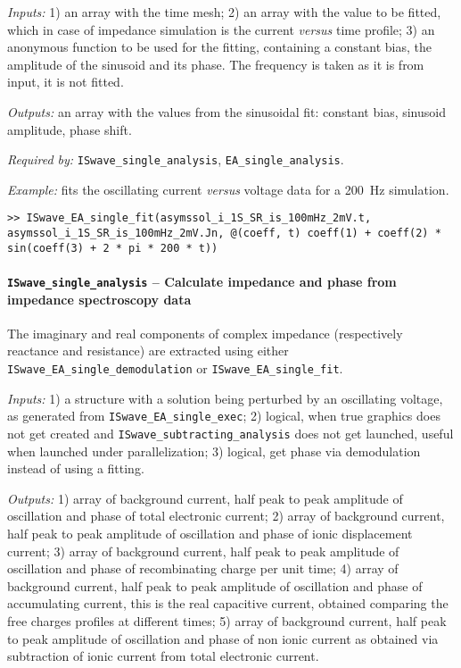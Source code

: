 	\textit{Inputs:} 1) an array with the time mesh;
	2) an array with the value to be fitted, which in case of impedance simulation is the current \textsl{versus} time profile;
	3) an anonymous function to be used for the fitting, containing
	a constant bias, the amplitude of the sinusoid and its phase. The
	frequency is taken as it is from input, it is not fitted.

	\textit{Outputs:} an array with the values from the sinusoidal fit: constant
	bias, sinusoid amplitude, phase shift.


	\textit{Required by:} \texttt{IS\-wave\_single\_analysis}, \texttt{EA\_single\_analysis}.

	\textit{Example:} fits the oscillating current \textsl{versus} voltage data for a \SI{200}{\Hz} simulation.
	\begin{lstlisting}[style=Matlab-editor]
>> ISwave_EA_single_fit(asymssol_i_1S_SR_is_100mHz_2mV.t, asymssol_i_1S_SR_is_100mHz_2mV.Jn, @(coeff, t) coeff(1) + coeff(2) * sin(coeff(3) + 2 * pi * 200 * t))
\end{lstlisting}



	\paragraph{\texttt{IS\-wave\_single\_analysis} -- Calculate impedance and phase from impedance spectroscopy data}
	The imaginary and real components of complex impedance (respectively reactance and resistance) are extracted using either \texttt{IS\-wave\_EA\_single\_demodulation} or \texttt{IS\-wave\_EA\_single\_fit}.

	\textit{Inputs:} 1) a structure with a solution being perturbed by an
	oscillating voltage, as generated from \texttt{IS\-wave\_EA\_single\_exec};
	2) logical, when true graphics does not get created and
	\texttt{IS\-wave\_subtracting\_analysis} does not get launched, useful when
	launched under parallelization;
	3) logical, get phase via demodulation instead of using a fitting.

	\textit{Outputs:} 1) array of background current, half peak to peak amplitude of
	oscillation and phase of total electronic current;
	2) array of background current, half peak to peak amplitude of
	oscillation and phase of ionic displacement current;
	3) array of background current, half peak to peak amplitude of
	oscillation and phase of recombinating charge per unit time;
	4) array of background current, half peak to peak amplitude of
	oscillation and phase of accumulating current, this is the real
	capacitive current, obtained comparing the free charges profiles at
	different times;
	5) array of background current, half peak to peak amplitude of
	oscillation and phase of non ionic current as obtained via
	subtraction of ionic current from total electronic current.

